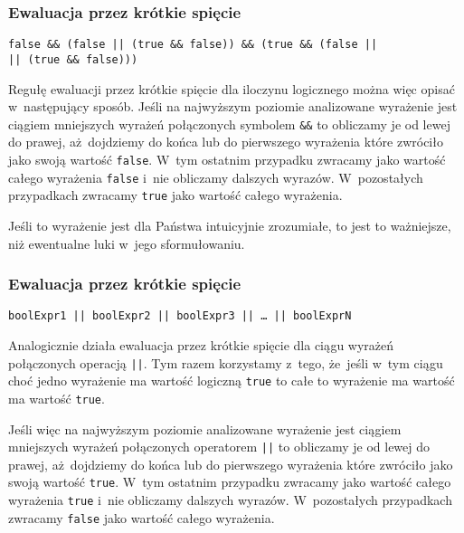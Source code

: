\documentclass[10pt,t]{beamer}
\begin{document}
\begin{frame}
  \frametitle{Ewaluacja przez krótkie spięcie}


  \texttt{false \&\& (false || (true \&\& false)) \&\& (true \&\&
    (false || \\ }
  \hphantom{aaaa}\texttt{|| (true \&\& false)))}



  Regułę ewaluacji przez krótkie spięcie dla iloczynu logicznego można więc
  opisać w~następujący sposób. Jeśli na najwyższym poziomie analizowane
  wyrażenie jest ciągiem mniejszych wyrażeń połączonych symbolem
  \texttt{\&\&} to obliczamy je od lewej do prawej, aż~dojdziemy do końca
  lub do pierwszego wyrażenia które zwróciło jako swoją wartość
  \texttt{false}. W~tym ostatnim przypadku zwracamy jako wartość całego
  wyrażenia \texttt{false} i~nie obliczamy dalszych wyrazów. W~pozostałych
  przypadkach zwracamy \texttt{true} jako wartość całego wyrażenia.

  Jeśli to wyrażenie jest dla Państwa intuicyjnie zrozumiałe, to jest to
  ważniejsze, niż ewentualne luki w~jego sformułowaniu.

\end{frame}





\begin{frame}
  \frametitle{Ewaluacja przez krótkie spięcie}


  \texttt{boolExpr1 || boolExpr2 || boolExpr3 || \ldots{} || boolExprN}

  Analogicznie działa ewaluacja przez krótkie spięcie dla ciągu wyrażeń
  połączonych operacją \texttt{||}. Tym razem korzystamy z~tego, że~jeśli
  w~tym ciągu choć jedno wyrażenie ma wartość logiczną \texttt{true} to całe
  to wyrażenie ma wartość ma wartość \texttt{true}.

  Jeśli więc na najwyższym poziomie analizowane wyrażenie jest ciągiem
  mniejszych wyrażeń połączonych operatorem \texttt{||} to obliczamy je od
  lewej do prawej, aż~dojdziemy do końca lub do pierwszego wyrażenia które
  zwróciło jako swoją wartość \texttt{true}. W~tym ostatnim przypadku
  zwracamy jako wartość całego wyrażenia \texttt{true} i~nie obliczamy
  dalszych wyrazów. W~pozostałych przypadkach zwracamy \texttt{false} jako
  wartość całego wyrażenia.

\end{frame}
\end{document}
